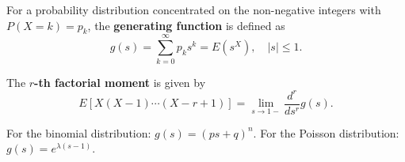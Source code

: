 For a probability distribution concentrated on the non-negative integers with $P(X = k) = p_k$, the \textbf{generating function} is defined as
$$g(s) = \sum_{k=0}^{\infty} p_k s^k = E(s^X), \quad |s| \leq 1.$$

The \textbf{$r$-th factorial moment} is given by
$$E[X(X-1) \cdots (X-r+1)] = \lim_{s \to 1-} \frac{d^r}{ds^r} g(s).$$

For the binomial distribution: $g(s) = (ps + q)^n$.
For the Poisson distribution: $g(s) = e^{\lambda(s-1)}$.
